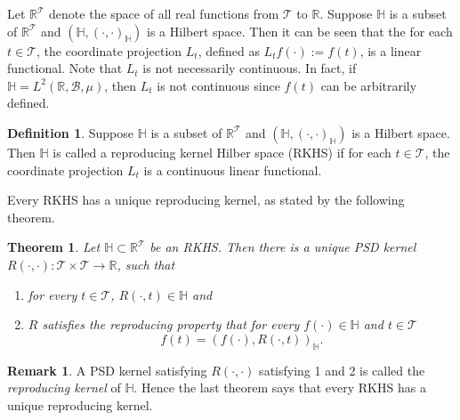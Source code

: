 \documentclass[11pt]{article}
\theoremstyle{plain}
\newtheorem{theorem}{\quad\quad Theorem}
\theoremstyle{definition}
\newtheorem{definition}{\quad\quad Definition}
\newtheorem{remark}{\quad\quad Remark}
\theoremstyle{remark}
\begin{document}
Let $\mathbb{R}^{\mathcal{T}}$ denote the space of all real functions from $\mathcal{T}$ to $\mathbb{R}$.
    Suppose $\mathbb{H}$ is a subset of $\mathbb{R}^{\mathcal{T}}$ and $(\mathbb{H},(\cdot,\cdot)_{\mathbb H})$ is a Hilbert space.
    Then it can be seen that the for each $t\in \mathcal{T}$, the coordinate projection $L_t$, defined as $L_t f(\cdot) :=f(t)$, is a linear functional.
    Note that $L_t$ is not necessarily continuous.
    In fact, if $\mathbb H = L^2(\mathbb{R},\mathcal B, \mu)$, then $L_t$ is not continuous since $f(t)$ can be arbitrarily defined.
\begin{definition}
    Suppose $\mathbb{H}$ is a subset of $\mathbb{R}^{\mathcal{T}}$ and $(\mathbb{H},(\cdot,\cdot)_{\mathbb H})$ is a Hilbert space.
    Then $\mathbb H$ is called a reproducing kernel Hilber space (RKHS) if for each $t\in \mathcal{T}$, the coordinate projection $L_t$ is a continuous linear functional.
\end{definition}

Every RKHS has a unique reproducing kernel, as stated by the following theorem.
\begin{theorem}
    Let $\mathbb H \subset \mathbb R^\mathcal T$ be an RKHS. Then there is a unique PSD kernel $R(\cdot,\cdot): \mathcal T \times \mathcal T \to \mathbb R$, such that 
    \begin{enumerate}
        \item 
            for every $t\in \mathcal T$, $R(\cdot,t)\in \mathbb H$ and
        \item
            $R$ satisfies the reproducing property that for every $f(\cdot) \in \mathbb H$ and $t\in \mathcal T$
            \begin{equation*}
                f(t)=(f(\cdot), R(\cdot, t))_{\mathbb H}.
            \end{equation*}
    \end{enumerate}
\end{theorem}

\begin{remark}
A PSD kernel satisfying $R(\cdot,\cdot)$ satisfying 1 and 2 is called the \emph{reproducing kernel} of $\mathbb H$.
Hence the last theorem says that every RKHS has a unique reproducing kernel.
\end{remark}
\end{document}

